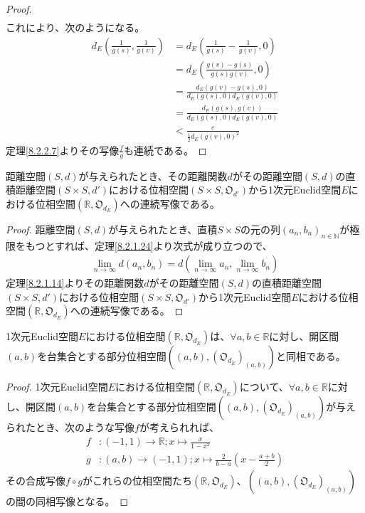 \documentclass[dvipdfmx]{jsarticle}
\begin{document}
\begin{proof}
\begin{align*}
\end{align*}
これにより、次のようになる。
\begin{align*}
d_{E}\left( \frac{1}{g(s)},\frac{1}{g(v)} \right) &= d_{E}\left( \frac{1}{g(s)} - \frac{1}{g(v)},0 \right)\\
&= d_{E}\left( \frac{g(v) - g(s)}{g(s)g(v)},0 \right)\\
&= \frac{d_{E}\left( g(v) - g(s),0 \right)}{d_{E}\left( g(s),0 \right)d_{E}\left( g(v),0 \right)}\\
&= \frac{d_{E}\left( g(s),g(v) \right)}{d_{E}\left( g(s),0 \right)d_{E}\left( g(v),0 \right)}\\
&< \frac{\varepsilon}{\frac{1}{2}{d_{E}\left( g(v),0 \right)}^{2}}
\end{align*}
定理\ref{8.2.2.7}よりその写像$\frac{f}{g}$も連続である。
\end{proof}
\begin{thm}\label{8.2.2.9}
距離空間$(S,d)$が与えられたとき、その距離関数$d$がその距離空間$(S,d)$の直積距離空間$\left( S \times S,d' \right)$における位相空間$\left( S \times S,\mathfrak{O}_{d'} \right)$から1次元Euclid空間$E$における位相空間$\left( \mathbb{R},\mathfrak{O}_{d_{E}} \right)$への連続写像である。
\end{thm}
\begin{proof}
距離空間$(S,d)$が与えられたとき、直積$S \times S$の元の列$\left( a_{n},b_{n} \right)_{n \in \mathbb{N}}$が極限をもつとすれば、定理\ref{8.2.1.24}より次式が成り立つので、
\begin{align*}
\lim_{n \rightarrow \infty}{d\left( a_{n},b_{n} \right)} = d\left( \lim_{n \rightarrow \infty}a_{n},\lim_{n \rightarrow \infty}b_{n} \right)
\end{align*}
定理\ref{8.2.1.14}よりその距離関数$d$がその距離空間$(S,d)$の直積距離空間$\left( S \times S,d' \right)$における位相空間$\left( S \times S,\mathfrak{O}_{d'} \right)$から1次元Euclid空間$E$における位相空間$\left( \mathbb{R},\mathfrak{O}_{d_{E}} \right)$への連続写像である。
\end{proof}
\begin{thm}\label{8.2.2.10}
1次元Euclid空間$E$における位相空間$\left( \mathbb{R},\mathfrak{O}_{d_{E}} \right)$は、$\forall a,b \in \mathbb{R}$に対し、開区間$(a,b)$を台集合とする部分位相空間$\left( (a,b),\left( \mathfrak{O}_{d_{E}} \right)_{(a,b)} \right)$と同相である。
\end{thm}
\begin{proof}
1次元Euclid空間$E$における位相空間$\left( \mathbb{R},\mathfrak{O}_{d_{E}} \right)$について、$\forall a,b \in \mathbb{R}$に対し、開区間$(a,b)$を台集合とする部分位相空間$\left( (a,b),\left( \mathfrak{O}_{d_{E}} \right)_{(a,b)} \right)$が与えられたとき、次のような写像$f$が考えられれば、
\begin{align*}
f&:( - 1,1) \rightarrow \mathbb{R};x \mapsto \frac{x}{1 - x^{2}}\\
g&:(a,b) \rightarrow ( - 1,1);x \mapsto \frac{2}{b - a}\left( x - \frac{a + b}{2} \right)
\end{align*}
その合成写像$f \circ g$がこれらの位相空間たち$\left( \mathbb{R},\mathfrak{O}_{d_{E}} \right)$、$\left( (a,b),\left( \mathfrak{O}_{d_{E}} \right)_{(a,b)} \right)$の間の同相写像となる。
\end{proof}
\end{document}
